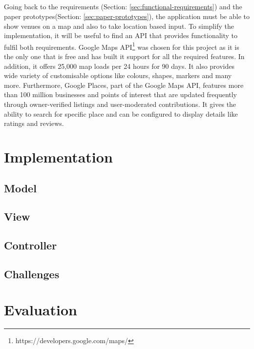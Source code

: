 \documentclass{l4proj}
\begin{document}
\paragraph{}
Going back to the requirements (Section: \ref{sec:functional-requirements}) and the paper prototypes(Section: \ref{sec:paper-prototypes}), the application must be able to show venues on a map and also to take location based input. To simplify the implementation, it will be useful to find an API that provides functionality to fulfil both requirements. Google Maps API\footnote{https://developers.google.com/maps/} was chosen for this project as it is the only one that is free and has built it support for all the required features. In addition, it offers 25,000 map loads per 24 hours for 90 days\cite{mapusage}. It also provides wide variety of customisable options like colours, shapes, markers and many more. Furthermore, Google Places\cite{mapplace}, part of the Google Maps API, features more than 100 million businesses and points of interest that are updated frequently through owner-verified listings and user-moderated contributions. It gives the ability to search for specific place and can be configured to display details like ratings and reviews.


\chapter{Implementation}

\section{Model}

\section{View}

\section{Controller}

\section{Challenges}

\chapter{Evaluation}
\end{document}
